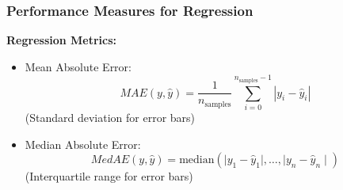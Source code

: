 \begin{frame}
  \frametitle{Performance Measures for Regression}
  \textbf{Regression Metrics:} \cite{scikit}
  \begin{itemize}
    \item Mean Absolute Error:
          $$\textit{MAE}(y, \hat{y}) = \frac{1}{n_{\text{samples}}} \sum_{i=0}^{n_{\text{samples}}-1} \left| y_i - \hat{y}_i \right|$$
          (Standard deviation for error bars)
    \item Median Absolute Error:
          $$\textit{MedAE}(y, \hat{y}) = \text{median}(\mid y_1 - \hat{y}_1 \mid, \ldots, \mid y_n - \hat{y}_n \mid)$$
          (Interquartile range for error bars)
  \end{itemize}
\end{frame}


